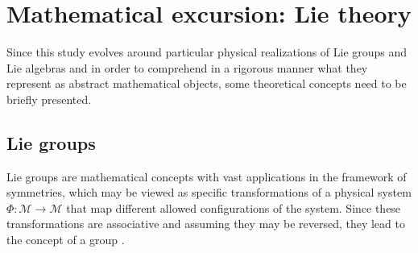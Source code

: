 \documentclass[12pt,a4paper]{report}
\theoremstyle{definition}
\theoremstyle{remark}
\theoremstyle{remark}
\begin{document}
\chapter{Mathematical excursion: Lie theory}
Since this study evolves around particular physical realizations of Lie groups and Lie algebras and in order to comprehend in a rigorous manner what they represent as abstract mathematical objects, some theoretical concepts need to be briefly presented. 

\section{Lie groups}
Lie groups are mathematical concepts with vast applications in the framework of symmetries, which may be viewed as specific transformations of a physical system $\Phi:\mathcal{M}\rightarrow\mathcal{M}$ that map different allowed configurations of the system. Since these transformations are associative and assuming they may be reversed, they lead to the concept of a group \cite{steinacker}.  
\end{document}
